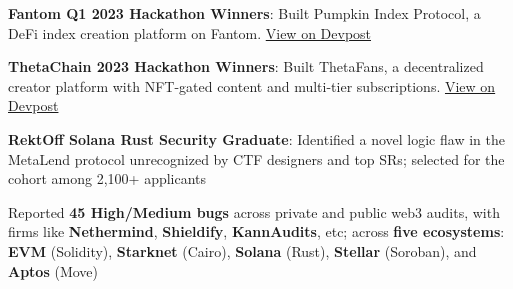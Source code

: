 \documentclass[letter,10pt]{article}
\begin{document}
\begin{zitemize}
  \item \textbf{Fantom Q1 2023 Hackathon Winners}: Built Pumpkin Index Protocol, a DeFi index creation platform on Fantom. \hfill \href{https://devpost.com/software/pumpkin-protocol}{View on Devpost}
  \item \textbf{ThetaChain 2023 Hackathon Winners}: Built ThetaFans, a decentralized creator platform with NFT-gated content and multi-tier subscriptions. \hfill \href{https://devpost.com/software/thetafans}{View on Devpost}
  \item \textbf{RektOff Solana Rust Security Graduate}: Identified a novel logic flaw in the MetaLend protocol unrecognized by CTF designers and top SRs; selected for the cohort among 2,100+ applicants
  \item Reported \textbf{45 High/Medium bugs} across private and public web3 audits, with firms like \textbf{Nethermind}, \textbf{Shieldify}, \textbf{KannAudits}, etc; across \textbf{five ecosystems}: \textbf{EVM} (Solidity), \textbf{Starknet} (Cairo), \textbf{Solana} (Rust), \textbf{Stellar} (Soroban), and \textbf{Aptos} (Move)
\end{zitemize}
\end{document}
